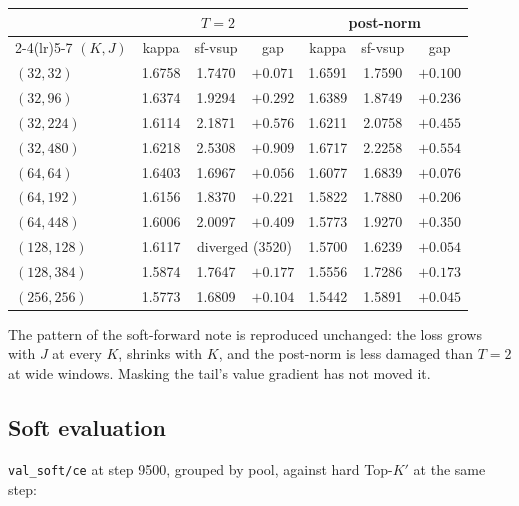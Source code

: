 \documentclass[11pt,a4paper]{article}
\newcommand{\code}[1]{\texttt{#1}}
\newcommand{\Kp}{K'}
\begin{document}
\begin{center}\small
\begin{tabular}{lcccccc}
\toprule
& \multicolumn{3}{c}{$T=2$} & \multicolumn{3}{c}{post-norm} \\
\cmidrule(lr){2-4}\cmidrule(lr){5-7}
$(K,J)$ & kappa & sf-vsup & gap & kappa & sf-vsup & gap \\
\midrule
$(32,32)$   & 1.6758 & 1.7470 & $+0.071$ & 1.6591 & 1.7590 & $+0.100$ \\
$(32,96)$   & 1.6374 & 1.9294 & $+0.292$ & 1.6389 & 1.8749 & $+0.236$ \\
$(32,224)$  & 1.6114 & 2.1871 & $+0.576$ & 1.6211 & 2.0758 & $+0.455$ \\
$(32,480)$  & 1.6218 & 2.5308 & $+0.909$ & 1.6717 & 2.2258 & $+0.554$ \\
$(64,64)$   & 1.6403 & 1.6967 & $+0.056$ & 1.6077 & 1.6839 & $+0.076$ \\
$(64,192)$  & 1.6156 & 1.8370 & $+0.221$ & 1.5822 & 1.7880 & $+0.206$ \\
$(64,448)$  & 1.6006 & 2.0097 & $+0.409$ & 1.5773 & 1.9270 & $+0.350$ \\
$(128,128)$ & 1.6117 & \multicolumn{2}{c}{diverged (3520)} & 1.5700 & 1.6239 & $+0.054$ \\
$(128,384)$ & 1.5874 & 1.7647 & $+0.177$ & 1.5556 & 1.7286 & $+0.173$ \\
$(256,256)$ & 1.5773 & 1.6809 & $+0.104$ & 1.5442 & 1.5891 & $+0.045$ \\
\bottomrule
\end{tabular}
\end{center}

The pattern of the soft-forward note is reproduced unchanged: the loss grows
with $J$ at every $K$, shrinks with $K$, and the post-norm is less damaged
than $T=2$ at wide windows. Masking the tail's value gradient has not moved
it.

\subsection*{Soft evaluation}

\code{val\_soft/ce} at step 9500, grouped by pool, against hard Top-$\Kp$
at the same step:
\end{document}
